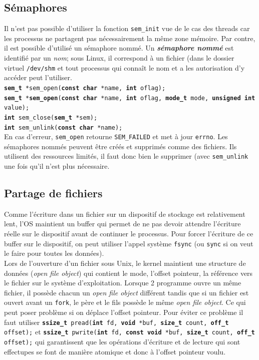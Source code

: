 \subsection{Sémaphores}
Il n'est pas possible d'utiliser la fonction \texttt{sem\_init} vue de le cas des threads car les processus ne partagent pas nécessairement la même zone mémoire. Par contre, il est possible d'utilisé un sémaphore nommé. Un \textbf{\textit{sémaphore nommé}} est identifié par un \textit{nom}; sous Linux, il correspond à un fichier (dans le dossier virtuel \texttt{/dev/shm} et tout processus qui connaît le nom et a les autorisation d'y accéder peut l'utiliser. \\
\texttt{\textbf{sem\_t} *sem\_open(\textbf{const char} *name, \textbf{int} oflag);\\
  \textbf{sem\_t} *\textbf{sem\_open}(\textbf{const char} *name, \textbf{int} oflag, \textbf{mode\_t} mode, \textbf{unsigned int} value);\\
  \textbf{int} sem\_close(\textbf{sem\_t} *sem);\\
\textbf{int} sem\_unlink(\textbf{const char} *name);}\\
En cas d'erreur, \texttt{sem\_open} retourne \texttt{SEM\_FAILED} et met à jour \texttt{errno}. Les sémaphores nommés peuvent être créés et supprimés comme des fichiers. Ils utilisent des ressources limités, il faut donc bien le supprimer (avec \texttt{sem\_unlink} une fois qu'il n'est plus nécessaire.

\subsection{Partage de fichiers}
Comme l'écriture dans un fichier sur un dispositif de stockage est relativement lent, l'OS maintient un buffer qui permet de ne pas devoir attendre l'écriture réelle sur le dispositif avant de continuer le processus. Pour forcer l'écriture de ce buffer sur le dispositif, on peut utiliser l'appel système \texttt{fsync} (ou \texttt{sync} si on veut le faire pour toutes les données).\\

Lors de l'ouverture d'un fichier sous Unix, le kernel maintient une structure de données (\textit{open file object}) qui contient le mode, l'offset pointeur, la référence vers le fichier sur le système d'exploitation. Lorsque 2 programme ouvre un même fichier, il possède chacun un \textit{open file object} différent tandis que si un fichier est ouvert avant un \texttt{fork}, le père et le fils possède le même \textit{open file object}. Ce qui peut poser problème si on déplace l'offset pointeur. Pour éviter ce problème il faut utiliser \texttt{\textbf{ssize\_t} pread(\textbf{int} fd, \textbf{void} *buf, \textbf{size\_t} count, \textbf{off\_t} offset);} et \texttt{\textbf{ssize\_t} pwrite(\textbf{int} fd, \textbf{const void} *buf, \textbf{size\_t} count, \textbf{off\_t} offset);} qui garantissent que les opérations d'écriture et de lecture qui sont effectupes se font de manière atomique et donc à l'offset pointeur voulu.\\

